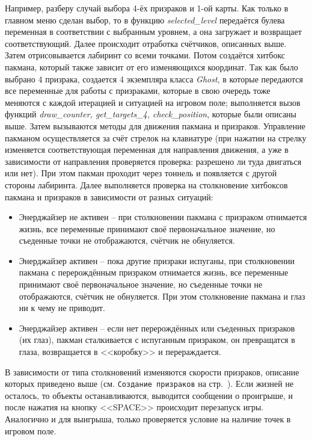 Например, разберу случай выбора 4-ёх призраков и 1-ой карты. Как только в главном меню сделан выбор, то в функцию \textit{selected\_level} передаётся булева переменная в соответствии с выбранным уровнем, а она загружает и возвращает соответствующий. Далее происходит отработка счётчиков, описанных выше. Затем отрисовывается лабиринт со всеми точками. Потом создаётся хитбокс пакмана, который также зависит от его изменяющихся координат. Так как было выбрано 4 призрака, создается 4 экземпляра класса \textit{Ghost}, в которые передаются все переменные для работы с призраками, которые в свою очередь тоже меняются с каждой итерацией и ситуацией на игровом поле; выполняется вызов функций \textit{draw\_counter, get\_targets\_4, check\_position}, которые были описаны выше. Затем вызываются методы для движения пакмана и призраков. Управление пакманом осуществляется за счёт стрелок на клавиатуре (при нажатии на стрелку изменяется соответствующая переменная для направления движения, а уже в зависимости от направления проверяется проверка: разрешено ли туда двигаться или нет). При этом пакман проходит через тоннель и появляется с другой стороны лабиринта. Далее выполняется проверка на столкновение хитбоксов пакмана и призраков в зависимости от разных ситуаций:
\begin{itemize}
	\item Энерджайзер не активен -- при столкновении пакмана с призраком отнимается жизнь, все переменные принимают своё первоначальное значение, но съеденные точки не отображаются, счётчик не обнуляется.
	\item Энерджайзер активен -- пока другие призраки испуганы, при столкновении пакмана с перерождённым призраком отнимается жизнь, все переменные принимают своё первоначальное значение, но съеденные точки не отображаются, счётчик не обнуляется. При этом столкновение пакмана и глаз ни к чему не приводит.
	\item Энерджайзер активен -- если нет перерождённых или съеденных призраков (их глаз), пакман сталкивается с испуганным призраком, он превращатся в глаза, возвращается в <<коробку>> и перераждается.
\end{itemize}
В зависимости от типа столкновений изменяются скорости призраков, описание которых приведено выше (см. \texttt{Создание призраков} на стр.~\pageref{subsec:ch02/sec01/sub06}). Если жизней не осталось, то объекты останавливаются, выводится сообщении о проигрыше, и после нажатия на кнопку <<SPACE>> происходит перезапуск игры. Аналогично и для выигрыша, только проверяется условие на наличие точек в игровом поле.
 
